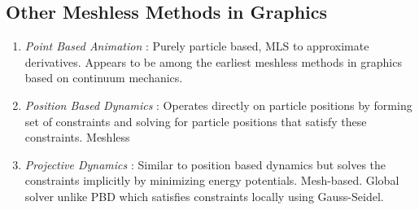 \documentclass[sigconf]{acmart}
\begin{document}
\subsection{Other Meshless Methods in Graphics}
\begin{enumerate}
    \item \textit{Point Based Animation }\cite{10.1145/1028523.1028542}: Purely particle based, MLS to approximate derivatives. Appears to be among the earliest meshless methods in graphics based on continuum mechanics. 
    \item \textit{Position Based Dynamics} \cite{MULLER2007109}: Operates directly on particle positions by forming set of constraints and solving for particle positions that satisfy these constraints. Meshless
    \item \textit{Projective Dynamics} \cite{10.1145/2601097.2601116}: Similar to position based dynamics but solves the constraints implicitly by minimizing energy potentials. Mesh-based. Global solver unlike PBD which satisfies constraints locally using Gauss-Seidel.
\end{enumerate}
\end{document}

